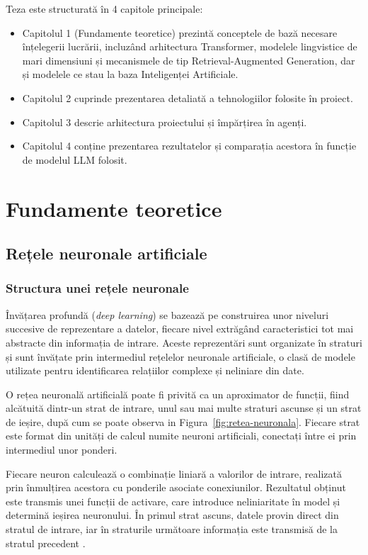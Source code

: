 \documentclass[12pt, a4paper, oneside, romanian]{teza-upb}
\begin{document}
Teza este structurată în 4 capitole principale:
\begin{itemize}
    \item Capitolul 1 (Fundamente teoretice) prezintă conceptele de bază necesare înțelegerii lucrării, incluzând arhitectura Transformer, modelele lingvistice de mari dimensiuni și mecanismele de tip Retrieval-Augmented Generation, dar și modelele ce stau la baza Inteligenței Artificiale.
    \item Capitolul 2 cuprinde prezentarea detaliată a tehnologiilor folosite în proiect.
    \item Capitolul 3 descrie arhitectura proiectului și împărțirea în agenți.
    \item Capitolul 4 conține prezentarea rezultatelor și comparația acestora în funcție de modelul LLM folosit.
\end{itemize}


\cleardoublepage
\chapter{Fundamente teoretice}

\section{Rețele neuronale artificiale}
    \subsection{Structura unei rețele neuronale}

Învățarea profundă (\textit{deep learning}) se bazează pe construirea unor niveluri succesive de reprezentare a datelor, fiecare nivel extrăgând caracteristici tot mai abstracte din informația de intrare. Aceste reprezentări sunt organizate în straturi și sunt învățate prin intermediul rețelelor neuronale artificiale, o clasă de modele utilizate pentru identificarea relațiilor complexe și neliniare din date.

O rețea neuronală artificială poate fi privită ca un aproximator de funcții, fiind alcătuită dintr-un strat de intrare, unul sau mai multe straturi ascunse și un strat de ieșire, după cum se poate observa in Figura~\ref{fig:retea-neuronala}. Fiecare strat este format din unități de calcul numite neuroni artificiali, conectați între ei prin intermediul unor ponderi.

Fiecare neuron calculează o combinație liniară a valorilor de intrare, realizată prin înmulțirea acestora cu ponderile asociate conexiunilor. Rezultatul obținut este transmis unei funcții de activare, care introduce neliniaritate în model și determină ieșirea neuronului. În primul strat ascuns, datele provin direct din stratul de intrare, iar în straturile următoare informația este transmisă de la stratul precedent \cite{curs_IA}.
\end{document}

